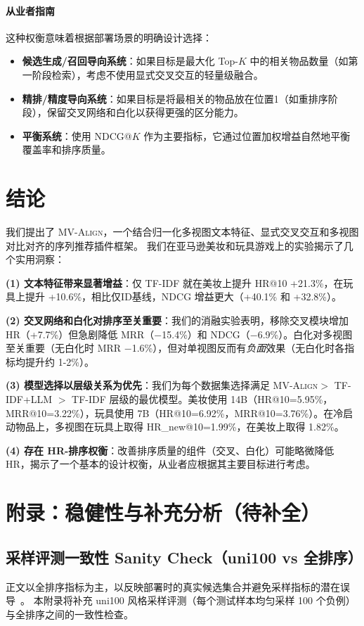 \documentclass[sigconf,natbib=true]{acmart}
\newcommand{\model}{\textsc{MV-Align}\xspace}
\newcommand{\tfidf}{\textsc{TF-IDF}\xspace}
\begin{document}
\paragraph{从业者指南}
这种权衡意味着根据部署场景的明确设计选择：
\begin{itemize}[leftmargin=*,itemsep=2pt]
  \item \textbf{候选生成/召回导向系统}：如果目标是最大化 Top-$K$ 中的相关物品数量（如第一阶段检索），考虑不使用显式交叉交互的轻量级融合。
  \item \textbf{精排/精度导向系统}：如果目标是将最相关的物品放在位置1（如重排序阶段），保留交叉网络和白化以获得更强的区分能力。
  \item \textbf{平衡系统}：使用 NDCG@$K$ 作为主要指标，它通过位置加权增益自然地平衡覆盖率和排序质量。
\end{itemize}

\section{结论}
我们提出了 \model，一个结合归一化多视图文本特征、显式交叉交互和多视图对比对齐的序列推荐插件框架。
我们在亚马逊美妆和玩具游戏上的实验揭示了几个实用洞察：

\textbf{(1) 文本特征带来显著增益}：仅 \tfidf 就在美妆上提升 HR@10 +21.3\%，在玩具上提升 +10.6\%，相比仅ID基线，NDCG 增益更大（+40.1\% 和 +32.8\%）。

\textbf{(2) 交叉网络和白化对排序至关重要}：我们的消融实验表明，移除交叉模块增加 HR（+7.7\%）但急剧降低 MRR（$-$15.4\%）和 NDCG（$-$6.9\%）。白化对多视图至关重要（无白化时 MRR $-$1.6\%），但对单视图反而有\emph{负面}效果（无白化时各指标均提升约 1-2\%）。

\textbf{(3) 模型选择以层级关系为优先}：我们为每个数据集选择满足 \model $>$ TF-IDF+LLM $>$ TF-IDF 层级的最优模型。美妆使用 14B（HR@10=5.95\%，MRR@10=3.22\%），玩具使用 7B（HR@10=6.92\%，MRR@10=3.76\%）。在冷启动物品上，多视图在玩具上取得 HR\_new@10=1.99\%，在美妆上取得 1.82\%。

\textbf{(4) 存在 HR-排序权衡}：改善排序质量的组件（交叉、白化）可能略微降低 HR，揭示了一个基本的设计权衡，从业者应根据其主要目标进行考虑。

\appendix
\section{附录：稳健性与补充分析（待补全）}
\label{sec:appendix}

\subsection{采样评测一致性 Sanity Check（uni100 vs 全排序）}
\label{app:sampled}
正文以全排序指标为主，以反映部署时的真实候选集合并避免采样指标的潜在误导~\cite{krichene2020sampledmetrics}。
本附录将补充 uni100 风格采样评测（每个测试样本均匀采样 100 个负例）与全排序之间的一致性检查。
\end{document}

